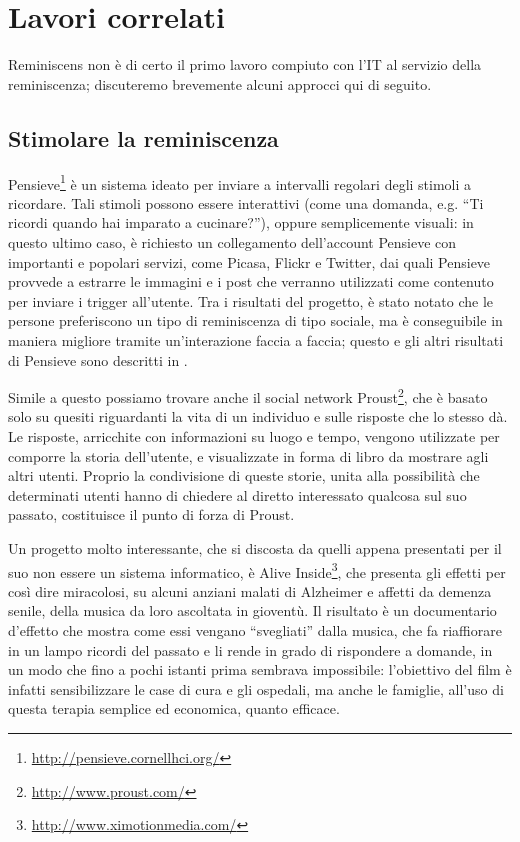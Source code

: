 \documentclass[sigproc-sp.tex]{subfiles}
\begin{document}
\section{Lavori correlati}
Reminiscens non è di certo il primo lavoro compiuto con l’IT al servizio della reminiscenza; discuteremo brevemente alcuni approcci qui di seguito.

\subsection{Stimolare la reminiscenza}
\label{subsec:stimuli}
Pensieve\footnote{\url{http://pensieve.cornellhci.org/}} è un sistema ideato per inviare a intervalli regolari degli stimoli a ricordare. Tali stimoli possono essere interattivi (come una domanda, e.g. “Ti ricordi quando hai imparato a cucinare?”), oppure semplicemente visuali: in questo ultimo caso, è richiesto un collegamento dell’account Pensieve con importanti e popolari servizi, come Picasa, Flickr e Twitter, dai quali Pensieve provvede a estrarre le immagini e i post che verranno utilizzati come contenuto per inviare i trigger all’utente. Tra i risultati del progetto, è stato notato che le persone preferiscono un tipo di reminiscenza di tipo sociale, ma è conseguibile in maniera migliore tramite un'interazione faccia a faccia; questo e gli altri risultati di Pensieve sono descritti in \cite{cosley2012experiences}.

Simile a questo possiamo trovare anche il social network Proust\footnote{\url{http://www.proust.com/}}, che è basato solo su quesiti riguardanti la vita di un individuo e sulle risposte che lo stesso dà. Le risposte, arricchite con informazioni su luogo e tempo, vengono utilizzate per comporre la storia dell’utente, e visualizzate in forma di libro da mostrare agli altri utenti. Proprio la condivisione di queste storie, unita alla possibilità che determinati utenti hanno di chiedere al diretto interessato qualcosa sul suo passato, costituisce il punto di forza di Proust.

Un progetto molto interessante, che si discosta da quelli appena presentati per il suo non essere un sistema informatico, è Alive Inside\footnote{\url{http://www.ximotionmedia.com/}}, che presenta gli effetti per così dire miracolosi, su alcuni anziani malati di Alzheimer e affetti da demenza senile, della musica da loro ascoltata in gioventù. Il risultato è un documentario d’effetto che mostra come essi vengano “svegliati” dalla musica, che fa riaffiorare in un lampo ricordi del passato e li rende in grado di rispondere a domande, in un modo che fino a pochi istanti prima sembrava impossibile: l’obiettivo del film è infatti sensibilizzare le case di cura e gli ospedali, ma anche le famiglie, all’uso di questa terapia semplice ed economica, quanto efficace.
\end{document}
